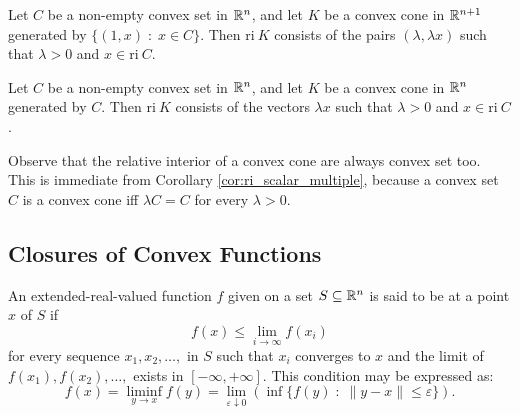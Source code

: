 \documentclass[11pt,a4paper]{article}
\begin{document}
\begin{corollary}
    Let $C$ be a non-empty convex set in $\mathbb{R}^n$, and let $K$ be a convex cone in $\mathbb{R}^{n+1}$ generated by $\{(1,x)\;:\;x\in C\}$. Then $\mathrm{ri}\ K$ consists of the pairs $(\lambda, \lambda x)$ such that $\lambda>0$ and $x\in \mathrm{ri}\ C$.
\end{corollary}

\begin{corollary}
    Let $C$ be a non-empty convex set in $\mathbb{R}^n$, and let $K$ be a convex cone in $\mathbb{R}^{n}$ generated by $C$. Then $\mathrm{ri}\ K$ consists of the vectors $\lambda x$ such that $\lambda>0$ and $x\in \mathrm{ri}\ C$.
\end{corollary}

\begin{remark}
    Observe that the relative interior of a convex cone are always convex set too. This is immediate from Corollary \ref{cor:ri_scalar_multiple}, because a convex set $C$ is a convex cone iff $\lambda C = C$ for every $\lambda >0$.
\end{remark}


\subsection{Closures of Convex Functions}

\begin{definition}
    An extended-real-valued function $f$ given on a set $S\subseteq \mathbb{R}^n$ is said to be  at a point $x$ of $S$ if 
    \begin{equation*}
        f(x)\le \lim_{i\rightarrow \infty} f(x_i)
    \end{equation*}
    for every sequence $x_1,x_2,\ldots,$ in $S$ such that $x_i$ converges to $x$ and the limit of $f(x_1),f(x_2),\ldots,$ exists in $[-\infty,+\infty]$. This condition may be expressed as:
    \begin{equation*}
        f(x) = \liminf_{y\rightarrow x} f(y) = \lim_{\varepsilon\downarrow 0} (\inf \{f(y)\;:\; \|y-x\|\le \varepsilon\}).
    \end{equation*}
\end{definition}
\end{document}
